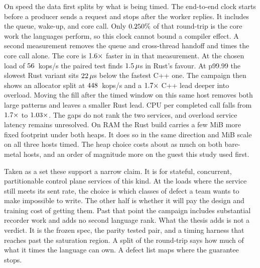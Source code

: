 \documentclass[english,oneside,a4paper,censored,csm,software-track-2020]{HYthesisML}
\begin{document}
On speed the data first splits by what is being timed. The end-to-end clock
starts before a producer sends a request and stops after the worker replies.
It includes the queue, wake-up, and core call. Only
$0.250\%$ of that round-trip is the core work the languages
perform, so this clock cannot bound a compiler effect. A second measurement
removes the queue and cross-thread handoff and times the core call alone. The
core is $1.6\times$ faster in \BudgetCoreFaster{} in that
measurement. At the chosen load of $56$~kops/s the paired test finds
$1.5\,\mu$s in Rust's favour. At p99.99 the slowest Rust variant sits
$22\,\mu$s below the fastest C++ one. The campaign then shows
an allocator split at $448$~kops/s and a $1.7\times$
C++ lead deeper into overload. Moving the fill after the timed window on
this same host removes both large patterns and leaves a smaller Rust lead.
CPU per completed call falls from $1.7\times$ to
$1.03\times$. The gaps do not rank the two services,
and overload service latency remains unresolved. On RAM
the Rust build carries a few MiB more fixed footprint under both heaps. It does so in
the same direction and MiB scale on all three hosts timed. The
heap choice costs about as much on both bare-metal hosts, and an order of
magnitude more on the guest this study used first.

Taken as a set these support a narrow claim. It is for stateful, concurrent,
partitionable control plane services of this kind. At the loads where the
service still meets its sent rate, the choice is which classes of defect a
team wants to make impossible to write. The other half is whether it will pay the
design and training cost of getting them. Past that point the campaign
includes substantial recorder work and adds no second language rank. What the thesis adds
is not a verdict. It is the frozen spec,
the parity tested pair, and a timing harness that reaches past the saturation
region. A split of the
round-trip says how much of what it times the language can own. A defect
list maps where the guarantee stops.
\end{document}
